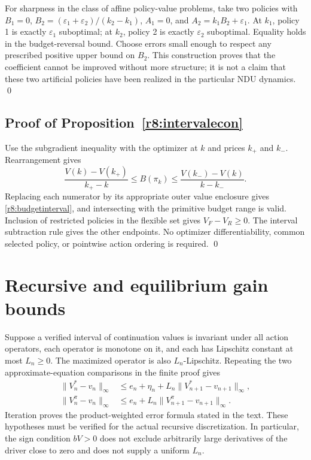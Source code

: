 For sharpness in the class of affine policy-value problems, take two policies with $B_1=0$, $B_2=(\varepsilon_1+\varepsilon_2)/(k_2-k_1)$, $A_1=0$, and $A_2=k_1B_2+\varepsilon_1$. At $k_1$, policy 1 is exactly $\varepsilon_1$ suboptimal; at $k_2$, policy 2 is exactly $\varepsilon_2$ suboptimal. Equality holds in the budget-reversal bound. Choose errors small enough to respect any prescribed positive upper bound on $B_2$. This construction proves that the coefficient cannot be improved without more structure; it is not a claim that these two artificial policies have been realized in the particular NDU dynamics. \qed

\subsection{Proof of Proposition~\ref{r8:intervalecon}}
Use the subgradient inequality with the optimizer at $k$ and prices $k_+$ and $k_-$. Rearrangement gives
\[
 \frac{V(k)-V(k_+)}{k_+-k}\leq B(\pi_k)
 \leq\frac{V(k_-)-V(k)}{k-k_-}.
\]
Replacing each numerator by its appropriate outer value enclosure gives \eqref{r8:budgetinterval}, and intersecting with the primitive budget range is valid. Inclusion of restricted policies in the flexible set gives $V_F-V_R\geq0$. The interval subtraction rule gives the other endpoints. No optimizer differentiability, common selected policy, or pointwise action ordering is required. \qed

\section{Recursive and equilibrium gain bounds}\label{r8:proof:recursive}
Suppose a verified interval of continuation values is invariant under all action operators, each operator is monotone on it, and each has Lipschitz constant at most $L_n\geq0$. The maximized operator is also $L_n$-Lipschitz. Repeating the two approximate-equation comparisons in the finite proof gives
\begin{align*}
 \|V_n^*-v_n\|_\infty&\leq e_n+\eta_n+L_n\|V_{n+1}^*-v_{n+1}\|_\infty,\\
 \|V_n^\pi-v_n\|_\infty&\leq e_n+L_n\|V_{n+1}^\pi-v_{n+1}\|_\infty.
\end{align*}
Iteration proves the product-weighted error formula stated in the text. These hypotheses must be verified for the actual recursive discretization. In particular, the sign condition $bV>0$ does not exclude arbitrarily large derivatives of the driver close to zero and does not supply a uniform $L_n$.

